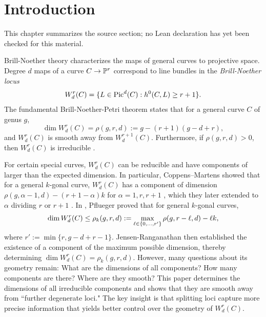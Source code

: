 \chapter{Introduction}
\label{refined-brill-noether-theory-hurwitz-spaces-chapter-01}

\begin{remark}
\label{refined-brill-noether-theory-hurwitz-spaces-chapter-01-source}
This chapter summarizes the source section; no Lean declaration has yet been
checked for this material.
\notready
\end{remark}

Brill-Noether theory characterizes the maps of general curves to projective space.
Degree $d$ maps of a curve $C \rightarrow \mathbb{P}^r$ correspond to line bundles in the \textit{Brill-Noether locus}
\[W^r_d(C) = \{ L \in \operatorname{Pic}^d(C): h^0(C, L) \geq r+1\}.\]
The fundamental Brill-Noether-Petri theorem \cite{GH,G} states that for a general curve $C$ of genus $g$,
\[\dim W^r_d(C) = \rho(g, r, d) := g - (r+1)(g - d + r),\]
and $W^r_d(C)$ is smooth away from $W^{r+1}_d(C)$. Furthermore, if $\rho(g, r, d) > 0$, then $W^r_d(C)$ is irreducible \cite{FL}.


For certain special curves, $W^r_d(C)$ can be reducible and have components of larger than the expected dimension.
In particular, Coppens--Martens showed that for a general $k$-gonal curve, $W^r_d(C)$ has a component of dimension $\rho(g, \alpha - 1, d) - (r+1 - \alpha)k$ for $\alpha = 1, r, r+1$ \cite{CM1}, which they later extended to $\alpha$ dividing $r$ or $r+1$ \cite{CM2}.
In \cite{Pf}, Pflueger proved that for general $k$-gonal curves,
\begin{equation} \label{theirformula}\dcref{1.1}
\source{refined-brill-noether-theory-hurwitz-spaces}
\dim W^r_d(C) \leq \rho_k(g, r, d) := \max_{\ell \in \{0, \ldots, r'\}} \rho(g, r - \ell, d) - \ell k,
\end{equation}
where $r' := \min\{r, g-d+r -1\}$.
Jensen-Ranganathan \cite{JR} then established the existence of a component of the maximum possible dimension, thereby determining $\dim W^r_d(C) = \rho_k(g, r, d)$.
However, many questions about its geometry remain: What are the dimensions of all components? How many components are there? Where are they smooth?
This paper determines the dimensions of all irreducible components and shows that they are smooth away from ``further degenerate loci." The key insight is that splitting loci capture more precise information that yields better control over the geometry of $W^r_d(C)$.

